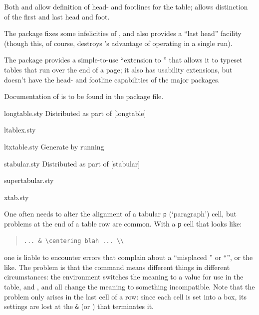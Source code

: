Both  and  allow definition
of head- and footlines for the table;  allows
distinction of the first and last head and foot.

The  package fixes some infelicities of
, and also provides a ``last head'' facility
(though this, of course, destroys 's advantage
of operating in a single run).

The  package provides a simple-to-use ``extension to
'' that allows it to typeset tables that run over
the end of a page; it also has usability extensions, but doesn't have
the head- and footline capabilities of the major packages.

Documentation of  is to be found in the package file.
\begin{ctanrefs}
\item[longtable.sty]Distributed as part of [longtable]
\item[ltablex.sty]
\item[ltxtable.sty]Generate by running 
\item[stabular.sty]Distributed as part of [stabular]
\item[supertabular.sty]
\item[xtab.sty]
\end{ctanrefs}


One often needs to alter the alignment of a tabular \texttt{p} (`paragraph')
cell, but problems at the end of a table row are common.  With a
\texttt{p} cell that looks like:
\begin{quote}
\begin{verbatim}
... & \centering blah ... \\
\end{verbatim}
\end{quote}
one is liable to encounter errors that complain about a ``misplaced
'' or ``'', or the like.
The problem is that the command \texttt{\bsbs } means different things in
different circumstances: the  environment
switches the meaning to a value for use in the table, and
,  and  all change the
meaning to something incompatible.  Note that the problem only
arises in the last cell of a row: since each cell is set into a box,
its settings are lost at the \texttt{\&} (or \texttt{\bsbs }) that
terminates it. 


